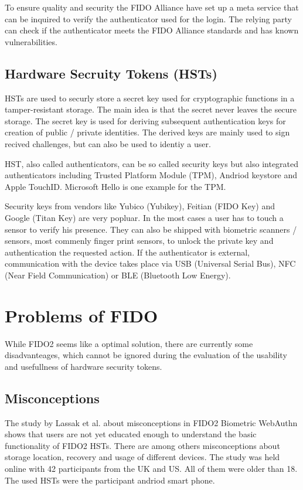 \documentclass[runningheads]{llncs}
\begin{document}
To ensure quality and security the FIDO Alliance have set up a meta service that can be inquired to verify the authenticator used for the login. The relying party can check if the authenticator meets the FIDO Alliance standards and has known vulnerabilities.\cite{9099190}

\subsection{Hardware Secruity Tokens (HSTs)}
HSTs are used to securly store a secret key used for cryptographic functions in a tamper-resistant storage. The main idea is that the secret never leaves the secure storage. The secret key is used for deriving subsequent authentication keys for creation of public / private identities. The derived keys are mainly used to sign recived challenges, but can also be used to identiy a user.\cite{272198}

HST, also called authenticators, can be so called security keys but also integrated authenticators including Trusted Platform Module (TPM), Andriod keystore and Apple TouchID. Microsoft Hello is one example for the TPM.

Security keys from vendors like Yubico (Yubikey), Feitian (FIDO Key) and Google (Titan Key) are very popluar. In the most cases a user has to touch a sensor to verify his presence. They can also be shipped with biometric scanners / sensors, most commenly finger print sensors, to unlock the private key and authentication the requested action. If the authenticator is external, communication with the device takes place via USB (Universal Serial Bus), NFC (Near Field Communication) or BLE (Bluetooth Low Energy).\cite{9152694}

\section{Problems of FIDO}
While FIDO2 seems like a optimal solution, there are currently some disadvanteages, which cannot be ignored during the evaluation of the usability and usefullness of hardware security tokens.

\subsection{Misconceptions}
The study by Lassak et al.\cite{274547} about misconceptions in FIDO2 Biometric WebAuthn shows that users are not yet educated enough to understand the basic functionality of FIDO2 HSTs. There are among others misconceptions about storage location, recovery and usage of different devices. The study was held online with 42 participants from the UK and US. All of them were older than 18. The used HSTs were the participant andriod smart phone.
\end{document}
